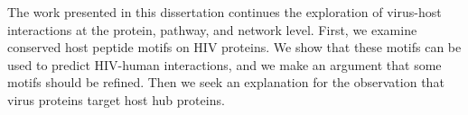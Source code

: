 The work presented in this dissertation continues the exploration of
virus-host interactions at the protein, pathway, and network
level. First, we examine conserved host peptide motifs on HIV
proteins. We show that these motifs can be used to predict HIV-human
interactions, and we make an argument that some motifs should be
refined. Then we seek an explanation for the observation that virus
proteins target host hub proteins.



